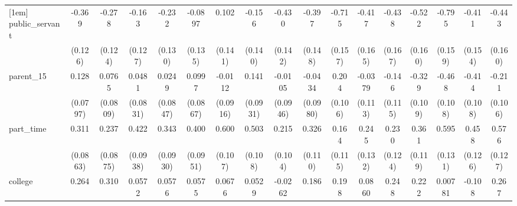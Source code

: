 {\begin{tabular}{l*{16}{c}}
[1em]
public\_servant      &      -0.369\sym{**} &      -0.278\sym{*}  &      -0.163         &      -0.232         &     -0.0897         &       0.102         &      -0.156         &      -0.430\sym{**} &      -0.397\sym{**} &      -0.715\sym{***}&      -0.417\sym{*}  &      -0.438\sym{**} &      -0.522\sym{**} &      -0.795\sym{***}&      -0.411\sym{**} &      -0.443\sym{**} \\
                    &     (0.126)         &     (0.124)         &     (0.127)         &     (0.130)         &     (0.135)         &     (0.141)         &     (0.140)         &     (0.142)         &     (0.148)         &     (0.157)         &     (0.165)         &     (0.167)         &     (0.160)         &     (0.159)         &     (0.154)         &     (0.160)         \\
[1em]
parent\_15           &       0.128         &      0.0765         &      0.0481         &      0.0249         &      0.0997         &     -0.0112         &       0.141         &     -0.0105         &     -0.0434         &       0.204         &     -0.0379         &      -0.146         &      -0.329\sym{**} &      -0.468\sym{***}&      -0.414\sym{***}&      -0.211\sym{*}  \\
                    &    (0.0797)         &    (0.0809)         &    (0.0831)         &    (0.0847)         &    (0.0867)         &    (0.0916)         &    (0.0931)         &    (0.0946)         &    (0.0980)         &     (0.106)         &     (0.113)         &     (0.115)         &     (0.109)         &     (0.108)         &     (0.108)         &     (0.106)         \\
[1em]
part\_time           &       0.311\sym{***}&       0.237\sym{**} &       0.422\sym{***}&       0.343\sym{***}&       0.400\sym{***}&       0.600\sym{***}&       0.503\sym{***}&       0.215\sym{*}  &       0.326\sym{**} &       0.164         &       0.245         &       0.230         &       0.361\sym{**} &       0.595\sym{***}&       0.458\sym{***}&       0.576\sym{***}\\
                    &    (0.0863)         &    (0.0875)         &    (0.0938)         &    (0.0930)         &    (0.0951)         &     (0.107)         &     (0.108)         &     (0.104)         &     (0.110)         &     (0.115)         &     (0.132)         &     (0.124)         &     (0.119)         &     (0.131)         &     (0.126)         &     (0.127)         \\
[1em]
college             &       0.264\sym{**} &       0.310\sym{**} &      0.0572         &      0.0576         &      0.0575         &      0.0676         &      0.0529         &     -0.0262         &       0.186         &       0.198         &      0.0860         &       0.248         &       0.222         &     0.00781         &      -0.108         &       0.267\sym{*}  \\

\end{tabular}}
